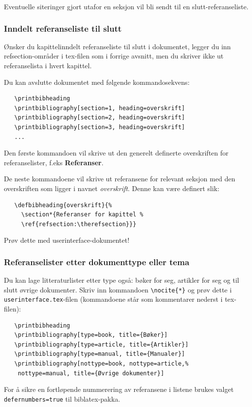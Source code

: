 \documentclass[11pt,norsk,a4paper]{article}
\begin{document}
Eventuelle siteringer gjort utafor en seksjon vil
bli sendt til en slutt-referanse\-liste.

\subsubsection*{Inndelt referanseliste til slutt}

Ønsker du kapittelinndelt referanseliste til slutt i dokumentet,
legger du inn refsection-områder i tex-filen som i forrige avsnitt,
men du skriver ikke ut referanselista i hvert kapittel.

Du kan avslutte dokumentet med følgende kommandosekvens:

{\footnotesize\begin{verbatim}
   \printbibheading
   \printbibliography[section=1, heading=overskrift]
   \printbibliography[section=2, heading=overskrift]
   \printbibliography[section=3, heading=overskrift]
   ...
\end{verbatim}}
\noindent{}Den første kommandoen vil skrive ut den generelt definerte
overskriften for referanselister, f.eks \textbf{Referanser}.

De neste kommandoene vil skrive ut referansene for relevant seksjon
med den overskriften som ligger i navnet \textit{overskrift}. Denne
kan være definert slik:\label{heading}

{\footnotesize\begin{verbatim}
   \defbibheading{overskrift}{%
     \section*{Referanser for kapittel %
     \ref{refsection:\therefsection}}}
\end{verbatim}}
\noindent{}Prøv dette med userinterface-dokumentet!

\subsubsection*{Referanselister etter dokumenttype eller tema}
Du kan lage litteraturlister etter type også: bøker for seg, artikler
for seg og til slutt øvrige dokumenter. Skriv inn kommandoen
\verb=\nocite{*}= og prøv dette i \texttt{userinterface.tex}-filen
(kommandoene står som kommentarer nederst i tex-filen):

{\footnotesize\begin{verbatim}
   \printbibheading
   \printbibliography[type=book, title={Bøker}]
   \printbibliography[type=article, title={Artikler}]
   \printbibliography[type=manual, title={Manualer}]
   \printbibliography[nottype=book, nottype=article,%
    nottype=manual, title={Øvrige dokumenter}]
\end{verbatim}}
\noindent{}For å sikre en fortløpende nummerering av referansene i listene brukes
valget \texttt{defernumbers=true} til biblatex-pakka.
\end{document}
